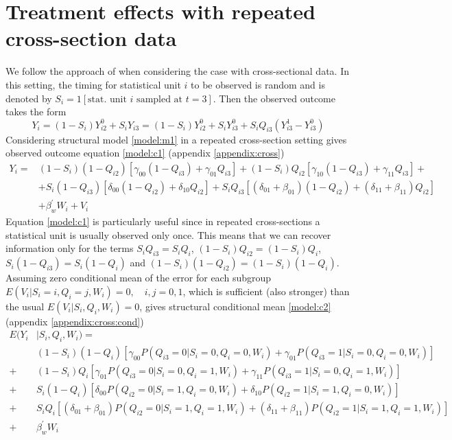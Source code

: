 \documentclass[12pt]{article}
\begin{document}
\section{Treatment effects with repeated cross-section data}
We follow the approach of \cite{lee2006identification} when considering the case with cross-sectional data. In this setting, the timing for statistical unit $i$ to be observed is random and is denoted by $S_i = 1[\text{stat. unit $i$ sampled at $t=3$}]$. Then the observed outcome takes the form 
\begin{equation*}
Y_i = (1-S_i)Y_{i2}^0 + S_iY_{i3} = (1-S_i)Y_{i2}^0 + S_iY_{i3}^0 + S_iQ_{i3}(Y_{i3}^1-Y_{i3}^0)
\end{equation*}
Considering structural model \ref{model:m1} in a repeated cross-section setting gives observed outcome equation \ref{model:c1} (appendix \ref{appendix:cross})
\begin{align*}\label{model:c1}
Y_i = & (1-S_i)(1-Q_{i2})[\gamma_{00}(1-Q_{i3})+\gamma_{01}Q_{i3}] + (1-S_i)Q_{i2}[\gamma_{10}(1-Q_{i3})+\gamma_{11}Q_{i3}] + \\ 
& +S_i(1-Q_{i3})[\delta_{00}(1-Q_{i2})+\delta_{10}Q_{i2}] + S_iQ_{i3}[(\delta_{01}+\beta_{01})(1-Q_{i2})+(\delta_{11}+\beta_{11})Q_{i2}]\\
& + \beta_w^\prime W_{i}  + V_{i} \tag{$C_1$}
\end{align*}
Equation \ref{model:c1} is particularly useful since in repeated cross-sections a statistical unit is usually observed only once. This means that we can recover information only for the terms $S_iQ_{i3}=S_iQ_{i}$, $(1-S_i)Q_{i2}=(1-S_i)Q_{i}$, $S_i(1-Q_{i3})=S_i(1-Q_{i})$ and $(1-S_i)(1-Q_{i2})=(1-S_i)(1-Q_{i})$. Assuming zero conditional mean of the error for each subgroup $E(V_{i}|S_{i}=i,Q_{i}=j,W_{i})=0, \quad i,j=0,1$, which is sufficient (also stronger) than the usual $E(V_{i}|S_{i},Q_{i},W_{i})=0$, gives structural conditional mean \ref{model:c2} (appendix \ref{appendix:cross:cond})
\begin{align*}\label{model:c2}
E(Y_i& |S_i,Q_i,W_i) = \\
& (1-S_i)(1-Q_{i})[\gamma_{00}P(Q_{i3}=0|S_i=0,Q_i=0,W_i)+\gamma_{01}P(Q_{i3}=1|S_i=0,Q_i=0,W_i)]\\
 +& (1-S_i)Q_{i}[\gamma_{01}P(Q_{i3}=0|S_i=0,Q_i=1,W_i)+\gamma_{11}P(Q_{i3}=1|S_i=0,Q_i=1,W_i)]\\
 + & S_i(1-Q_{i})[\delta_{00}P(Q_{i2}=0|S_i=1,Q_i=0,W_i)+\delta_{10}P(Q_{i2}=1|S_i=1,Q_i=0,W_i)]\\
 + & S_iQ_{i}[(\delta_{01}+\beta_{01})P(Q_{i2}=0|S_i=1,Q_i=1,W_i)+(\delta_{11}+\beta_{11})P(Q_{i2}=1|S_i=1,Q_i=1,W_i)] \\
 +&  \beta_w^\prime W_{i} \tag{$C_2$}
\end{align*}
\end{document}
